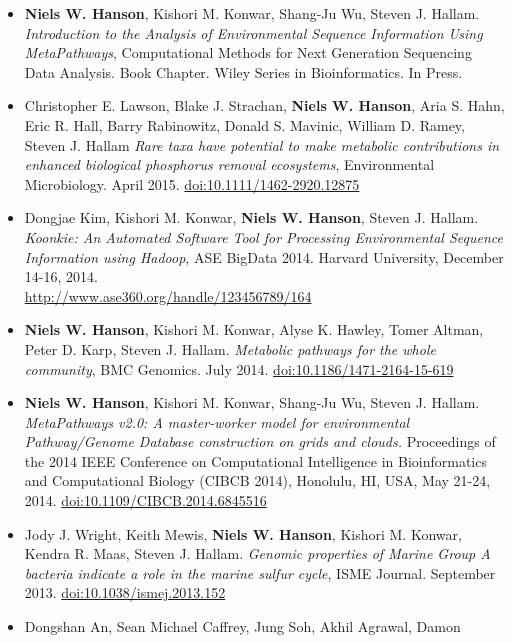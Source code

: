 \documentclass[print]{hanson_cv} %
\begin{document}
\begin{itemize}
\item
  \textbf{Niels W. Hanson}, Kishori M. Konwar, Shang-Ju Wu, Steven J. Hallam. \emph{Introduction to the Analysis of Environmental Sequence Information Using MetaPathways}, Computational Methods for Next Generation Sequencing Data Analysis. Book Chapter. Wiley Series in Bioinformatics. In Press.
\item
  Christopher E. Lawson, Blake J. Strachan, \textbf{Niels W. Hanson}, Aria S. Hahn, Eric R. Hall, Barry Rabinowitz, Donald S. Mavinic, William D. Ramey, Steven J. Hallam \emph{Rare taxa have potential to make metabolic contributions in enhanced biological phosphorus removal ecosystems}, Environmental Microbiology. April 2015. \href{http://dx.doi.org/10.1111/1462-2920.12875}{doi:10.1111/1462-2920.12875} 
\item
  Dongjae Kim, Kishori M. Konwar, \textbf{Niels W. Hanson}, Steven J.
  Hallam. \emph{Koonkie: An Automated Software Tool for Processing
  Environmental Sequence Information using Hadoop}, ASE BigData 2014.
  Harvard University, December 14-16,
  2014.\\\href{http://www.ase360.org/handle/123456789/164}{http://www.ase360.org/handle/123456789/164}
\item
  \textbf{Niels W. Hanson}, Kishori M. Konwar, Alyse K. Hawley, Tomer
  Altman, Peter D. Karp, Steven J. Hallam. \emph{Metabolic pathways for
  the whole community}, BMC Genomics. July 2014.
  \href{http://dx.doi.org/10.1186/1471-2164-15-619}{doi:10.1186/1471-2164-15-619}
\item
  \textbf{Niels W. Hanson}, Kishori M. Konwar, Shang-Ju Wu, Steven J.
  Hallam. \emph{MetaPathways v2.0: A master-worker model for
  environmental Pathway/Genome Database construction on grids and
  clouds.} Proceedings of the 2014 IEEE Conference on Computational
  Intelligence in Bioinformatics and Computational Biology (CIBCB 2014),
  Honolulu, HI, USA, May 21-24, 2014.
  \href{http://ieeexplore.ieee.org/xpl/articleDetails.jsp?arnumber=6845516}{doi:10.1109/CIBCB.2014.6845516}
\item
  Jody J. Wright, Keith Mewis, \textbf{Niels W. Hanson}, Kishori M.
  Konwar, Kendra R. Maas, Steven J. Hallam. \emph{Genomic properties of
  Marine Group A bacteria indicate a role in the marine sulfur cycle},
  ISME Journal. September 2013.
  \href{http://dx.doi.org/10.1038/ismej.2013.152}{doi:10.1038/ismej.2013.152}
\item
  Dongshan An, Sean Michael Caffrey, Jung Soh, Akhil Agrawal, Damon

\end{itemize}
\end{document}
